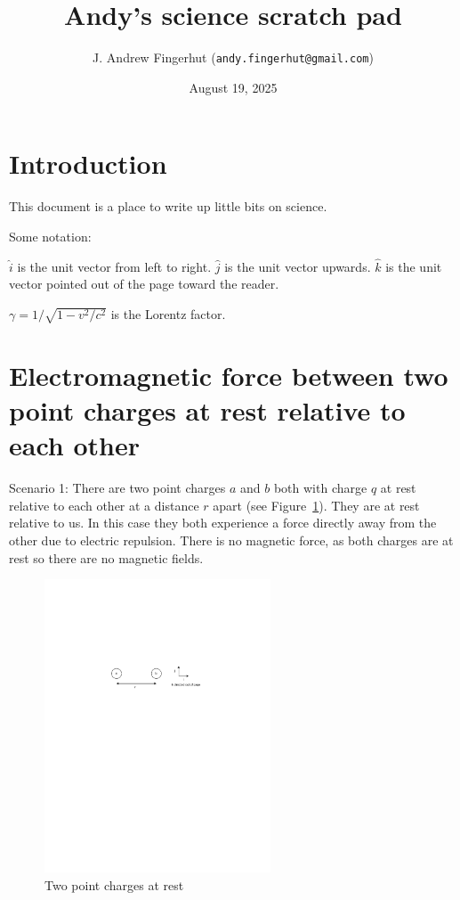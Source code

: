 \documentclass[a4paper]{article}
\title{Andy's science scratch pad}
\author{J. Andrew Fingerhut (\texttt{andy.fingerhut@gmail.com})}
\date{
        August 19, 2025
}
\theoremstyle{plain}
\theoremstyle{definition}
\newcommand{\hatvec}[1]{\hat{#1}}
\newcommand{\ihat}{\hatvec{i}}
\newcommand{\jhat}{\hatvec{j}}
\newcommand{\khat}{\hatvec{k}}
\begin{document}
\maketitle


\tableofcontents

\section{Introduction}
\label{sec:intro}

This document is a place to write up little bits on science.

Some notation:

$\ihat$ is the unit vector from left to right.
$\jhat$ is the unit vector upwards.
$\khat$ is the unit vector pointed out of the page toward the reader.

$\gamma = 1/\sqrt{1-v^2/c^2}$ is the Lorentz factor.


\section{Electromagnetic force between two point charges at rest relative to each other}
\label{sec:twocharges}

Scenario 1: There are two point charges $a$ and $b$ both with charge
$q$ at rest relative to each other at a distance $r$ apart (see
Figure~\ref{fig:two-charges-at-rest}).  They are at rest relative
to us.  In this case they both experience a force directly away from
the other due to electric repulsion.  There is no magnetic force, as
both charges are at rest so there are no magnetic fields.

\begin{figure}[ht]
	\centering
	\includegraphics[width=0.6\textwidth]{two-charges-at-rest-cropped.pdf}
	\caption{Two point charges at rest}
	\label{fig:two-charges-at-rest}
\end{figure}
\end{document}
